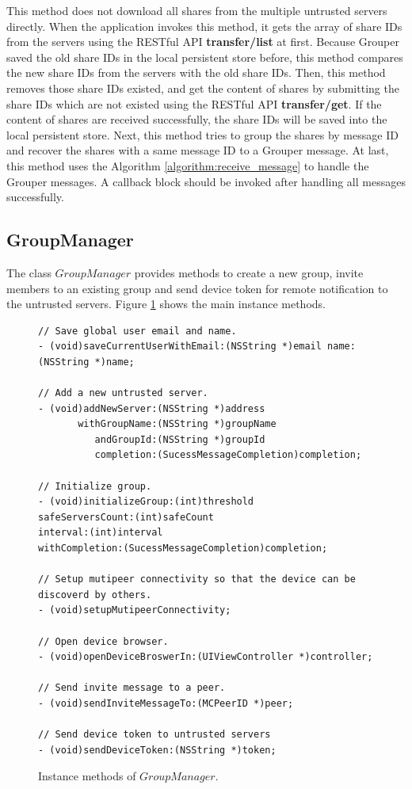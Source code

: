 \documentclass[a4paper,11pt]{report}
\begin{document}
This method does not download all shares from the multiple untrusted servers directly.
When the application invokes this method, it gets the array of share IDs from the servers using the RESTful API \textbf{transfer/list} at first.
Because Grouper saved the old share IDs in the local persistent store before, this method compares the new  share IDs from the servers with the old share IDs.
Then, this method removes those share IDs existed, and get the content of shares by submitting the share IDs which are not existed using the RESTful API \textbf{transfer/get}.
If the content of shares are received successfully, the share IDs will be saved into the local persistent store.
Next, this method tries to group the shares by message ID and recover the shares with a same message ID to a Grouper message.
At last, this method uses the Algorithm \ref{algorithm:receive_message} to handle the Grouper messages.
A callback block should be invoked after handling all messages successfully.

\subsection{GroupManager}

The class $GroupManager$ provides methods to create a new group, invite members to an existing group and send device token for remote notification to the untrusted servers.
Figure \ref{fig:group_manager} shows the main instance methods.

\begin{figure}
\begin{lstlisting}[frame=none language=Objective-C] 
// Save global user email and name.
- (void)saveCurrentUserWithEmail:(NSString *)email name:(NSString *)name;

// Add a new untrusted server.
- (void)addNewServer:(NSString *)address
       withGroupName:(NSString *)groupName
          andGroupId:(NSString *)groupId
          completion:(SucessMessageCompletion)completion;

// Initialize group.
- (void)initializeGroup:(int)threshold
safeServersCount:(int)safeCount
interval:(int)interval
withCompletion:(SucessMessageCompletion)completion;

// Setup mutipeer connectivity so that the device can be discoverd by others.
- (void)setupMutipeerConnectivity;

// Open device browser.
- (void)openDeviceBroswerIn:(UIViewController *)controller;

// Send invite message to a peer.
- (void)sendInviteMessageTo:(MCPeerID *)peer;

// Send device token to untrusted servers
- (void)sendDeviceToken:(NSString *)token;	
\end{lstlisting}
\caption{Instance methods of $GroupManager$.}
\label{fig:group_manager}
\end{figure}
\end{document}
